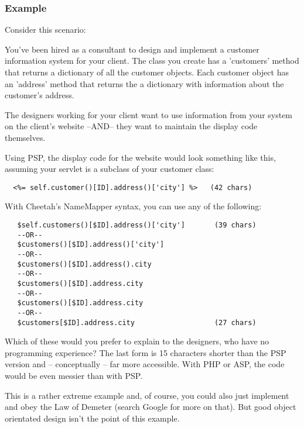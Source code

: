 \subsubsection{Example}
\label{language.namemapper.example}

Consider this scenario:

You've been hired as a consultant to design and implement a customer information
system for your client. The class you create has a 'customers' method that
returns a dictionary of all the customer objects.  Each customer object has an
'address' method that returns the a dictionary with information about the
customer's address.

The designers working for your client want to use information from your system
on the client's website --AND-- they want to maintain the display code
themselves.

Using PSP, the display code for the website would look something like this,
assuming your servlet is a subclass of your customer class:


\begin{verbatim}
  <%= self.customer()[ID].address()['city'] %>   (42 chars)
\end{verbatim}

With Cheetah's NameMapper syntax, you can use any of the following:

\begin{verbatim}
   $self.customers()[$ID].address()['city']       (39 chars)
   --OR--                                         
   $customers()[$ID].address()['city']           
   --OR--                                         
   $customers()[$ID].address().city              
   --OR--                                         
   $customers()[$ID].address.city                
   --OR--                                         
   $customers()[$ID].address.city
   --OR--
   $customers[$ID].address.city                   (27 chars)                     
\end{verbatim}   

Which of these would you prefer to explain to the designers, who have no
programming experience?  The last form is 15 characters shorter than the PSP
version and -- conceptually -- far more accessible. With PHP or ASP, the
code would be even messier than with PSP.

This is a rather extreme example and, of course, you could also just implement
 and obey the Law of Demeter (search Google for more
on that).  But good object orientated design isn't the point of this example.

